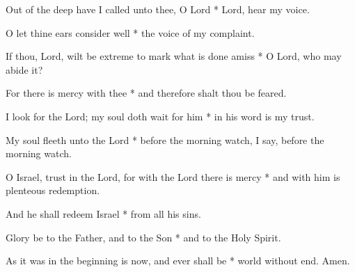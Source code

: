 Out of the deep have I called unto thee, O Lord * Lord, hear my voice.

O let thine ears consider well * the voice of my complaint.
	
If thou, Lord, wilt be extreme to mark what is done amiss * O Lord, who may abide it?
	
For there is mercy with thee * and therefore shalt thou be feared.
	
I look for the Lord; my soul doth wait for him * in his word is my trust.
	
My soul fleeth unto the Lord * before the morning watch, I say, before the morning watch.
	
O Israel, trust in the Lord, for with the Lord there is mercy * and with him is plenteous redemption.
	
And he shall redeem Israel * from all his sins.
	
Glory be to the Father, and to the Son * and to the Holy Spirit.
	
As it was in the beginning is now, and ever shall be * world without end. Amen.
